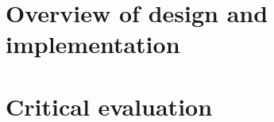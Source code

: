 \documentclass[12pt,a4paper,titlepage]{article}
\begin{document}
\section{Overview of design and implementation}
\newpage
\section{Critical evaluation}
\end{document}
